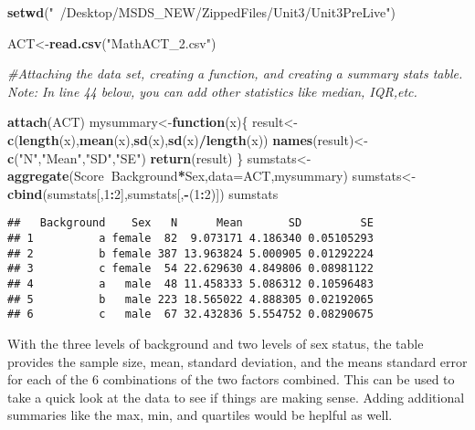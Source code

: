\documentclass[]{article}
\newenvironment{Shaded}{\begin{snugshade}}{\end{snugshade}}
\newcommand{\CommentTok}[1]{\textcolor[rgb]{0.56,0.35,0.01}{\textit{#1}}}
\newcommand{\ControlFlowTok}[1]{\textcolor[rgb]{0.13,0.29,0.53}{\textbf{#1}}}
\newcommand{\DataTypeTok}[1]{\textcolor[rgb]{0.13,0.29,0.53}{#1}}
\newcommand{\DecValTok}[1]{\textcolor[rgb]{0.00,0.00,0.81}{#1}}
\newcommand{\KeywordTok}[1]{\textcolor[rgb]{0.13,0.29,0.53}{\textbf{#1}}}
\newcommand{\NormalTok}[1]{#1}
\newcommand{\OperatorTok}[1]{\textcolor[rgb]{0.81,0.36,0.00}{\textbf{#1}}}
\newcommand{\StringTok}[1]{\textcolor[rgb]{0.31,0.60,0.02}{#1}}
\begin{document}
\begin{Shaded}
\begin{Highlighting}[]
\KeywordTok{setwd}\NormalTok{(}\StringTok{"~/Desktop/MSDS_NEW/ZippedFiles/Unit3/Unit3PreLive"}\NormalTok{)}

\NormalTok{ACT<-}\KeywordTok{read.csv}\NormalTok{(}\StringTok{"MathACT_2.csv"}\NormalTok{)}


\CommentTok{#Attaching the data set, creating a function, and creating a summary stats table.  Note: In line 44 below, you can add other statistics like median, IQR,etc.}

\KeywordTok{attach}\NormalTok{(ACT)}
\NormalTok{mysummary<-}\ControlFlowTok{function}\NormalTok{(x)\{}
\NormalTok{  result<-}\KeywordTok{c}\NormalTok{(}\KeywordTok{length}\NormalTok{(x),}\KeywordTok{mean}\NormalTok{(x),}\KeywordTok{sd}\NormalTok{(x),}\KeywordTok{sd}\NormalTok{(x)}\OperatorTok{/}\KeywordTok{length}\NormalTok{(x))}
  \KeywordTok{names}\NormalTok{(result)<-}\KeywordTok{c}\NormalTok{(}\StringTok{"N"}\NormalTok{,}\StringTok{"Mean"}\NormalTok{,}\StringTok{"SD"}\NormalTok{,}\StringTok{"SE"}\NormalTok{)}
  \KeywordTok{return}\NormalTok{(result)}
\NormalTok{\}}
\NormalTok{sumstats<-}\KeywordTok{aggregate}\NormalTok{(Score}\OperatorTok{~}\NormalTok{Background}\OperatorTok{*}\NormalTok{Sex,}\DataTypeTok{data=}\NormalTok{ACT,mysummary)}
\NormalTok{sumstats<-}\KeywordTok{cbind}\NormalTok{(sumstats[,}\DecValTok{1}\OperatorTok{:}\DecValTok{2}\NormalTok{],sumstats[,}\OperatorTok{-}\NormalTok{(}\DecValTok{1}\OperatorTok{:}\DecValTok{2}\NormalTok{)])}
\NormalTok{sumstats}
\end{Highlighting}
\end{Shaded}

\begin{verbatim}
##   Background    Sex   N      Mean       SD         SE
## 1          a female  82  9.073171 4.186340 0.05105293
## 2          b female 387 13.963824 5.000905 0.01292224
## 3          c female  54 22.629630 4.849806 0.08981122
## 4          a   male  48 11.458333 5.086312 0.10596483
## 5          b   male 223 18.565022 4.888305 0.02192065
## 6          c   male  67 32.432836 5.554752 0.08290675
\end{verbatim}

With the three levels of background and two levels of sex status, the
table provides the sample size, mean, standard deviation, and the means
standard error for each of the 6 combinations of the two factors
combined. This can be used to take a quick look at the data to see if
things are making sense. Adding additional summaries like the max, min,
and quartiles would be heplful as well.
\end{document}
